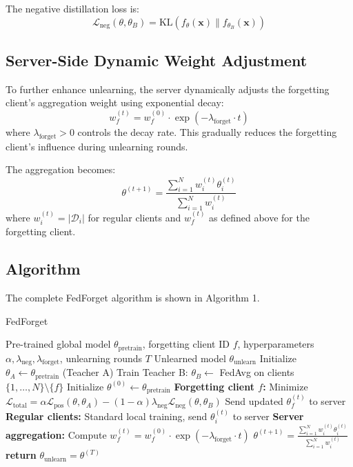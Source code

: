 \documentclass[10pt,twocolumn]{article}
\begin{document}
The negative distillation loss is:
\begin{equation}
\mathcal{L}_{\text{neg}}(\theta, \theta_B) = \text{KL}(f_\theta(\mathbf{x}) \| f_{\theta_B}(\mathbf{x}))
\end{equation}

\subsection{Server-Side Dynamic Weight Adjustment}

To further enhance unlearning, the server dynamically adjusts the forgetting client's aggregation weight using exponential decay:
\begin{equation}
w_f^{(t)} = w_f^{(0)} \cdot \exp(-\lambda_{\text{forget}} \cdot t)
\end{equation}
where $\lambda_{\text{forget}} > 0$ controls the decay rate. This gradually reduces the forgetting client's influence during unlearning rounds.

The aggregation becomes:
\begin{equation}
\theta^{(t+1)} = \frac{\sum_{i=1}^{N} w_i^{(t)} \theta_i^{(t)}}{\sum_{i=1}^{N} w_i^{(t)}}
\end{equation}
where $w_i^{(t)} = |\mathcal{D}_i|$ for regular clients and $w_f^{(t)}$ as defined above for the forgetting client.

\subsection{Algorithm}

The complete FedForget algorithm is shown in Algorithm 1.

\begin{algorithm}
\caption{FedForget}
\begin{algorithmic}[1]
\REQUIRE Pre-trained global model $\theta_{\text{pretrain}}$, forgetting client ID $f$, hyperparameters $\alpha, \lambda_{\text{neg}}, \lambda_{\text{forget}}$, unlearning rounds $T$
\ENSURE Unlearned model $\theta_{\text{unlearn}}$
\STATE Initialize $\theta_A \leftarrow \theta_{\text{pretrain}}$ (Teacher A)
\STATE Train Teacher B: $\theta_B \leftarrow$ FedAvg on clients $\{1,\ldots,N\}\setminus\{f\}$
\STATE Initialize $\theta^{(0)} \leftarrow \theta_{\text{pretrain}}$
    \STATE \textbf{Forgetting client $f$:}
    \STATE \quad Minimize $\mathcal{L}_{\text{total}} = \alpha \mathcal{L}_{\text{pos}}(\theta, \theta_A) - (1-\alpha) \lambda_{\text{neg}} \mathcal{L}_{\text{neg}}(\theta, \theta_B)$
    \STATE \quad Send updated $\theta_f^{(t)}$ to server
    \STATE \textbf{Regular clients:}
    \STATE \quad Standard local training, send $\theta_i^{(t)}$ to server
    \STATE \textbf{Server aggregation:}
    \STATE \quad Compute $w_f^{(t)} = w_f^{(0)} \cdot \exp(-\lambda_{\text{forget}} \cdot t)$
    \STATE \quad $\theta^{(t+1)} = \frac{\sum_{i=1}^{N} w_i^{(t)} \theta_i^{(t)}}{\sum_{i=1}^{N} w_i^{(t)}}$
\ENDFOR
\STATE \textbf{return} $\theta_{\text{unlearn}} = \theta^{(T)}$
\end{algorithmic}
\end{algorithm}
\end{document}
